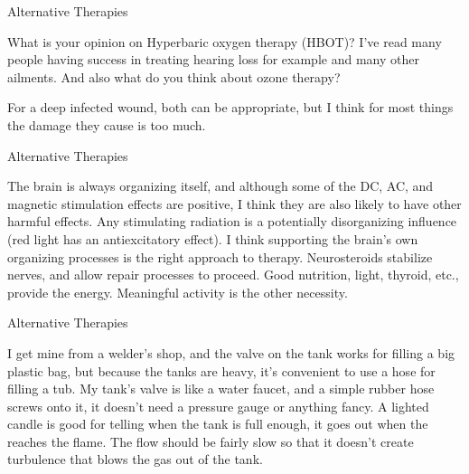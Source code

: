 \documentclass[11pt,oneside,openany,extrafontsizes]{memoir}
\begin{document}
\begin{qaexchange}{Alternative Therapies}

    \begin{question}
        What is your opinion on Hyperbaric oxygen therapy (HBOT)? I've read many people having success in treating hearing loss for example and many other ailments. And also what do you think about ozone therapy?
    \end{question}

    \begin{answer}
      For a deep infected wound, both can be appropriate, but I think for most things the damage they cause is too much.
    \end{answer}
\end{qaexchange}

\begin{standalonequote}{Alternative Therapies}

    \begin{answer}
      The brain is always organizing itself, and although some of the DC, AC, and magnetic stimulation effects are positive, I think they are also likely to have other harmful effects. Any stimulating radiation is a potentially disorganizing influence (red light has an antiexcitatory effect). I think supporting the brain's own organizing processes is the right approach to therapy. Neurosteroids stabilize nerves, and allow repair processes to proceed. Good nutrition, light, thyroid, etc., provide the energy. Meaningful activity is the other necessity.

    \end{answer}
\end{standalonequote}

\begin{standalonequote}{Alternative Therapies}

    \begin{answer}
      I get mine from a welder's shop, and the valve on the tank works for filling a big plastic bag, but because the tanks are heavy, it's convenient to use a hose for filling a tub. My tank's valve is like a water faucet, and a simple rubber hose screws onto it, it doesn't need a pressure gauge or anything fancy. A lighted candle is good for telling when the tank is full enough, it goes out when the  reaches the flame. The flow should be fairly slow so that it doesn't create turbulence that blows the gas out of the tank.
    \end{answer}
\end{standalonequote}
\end{document}
